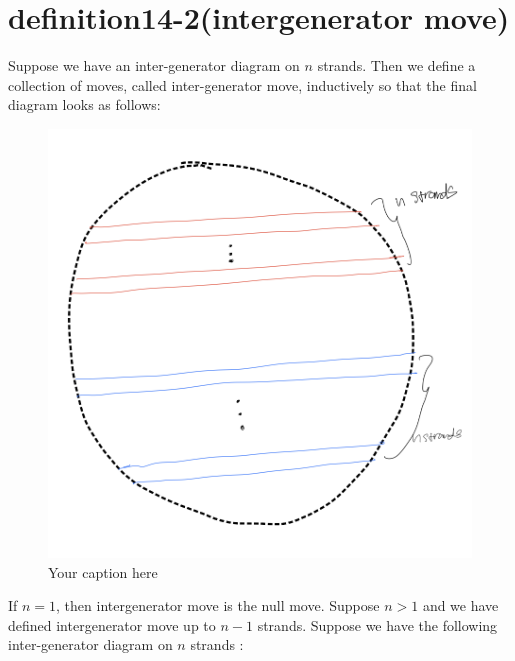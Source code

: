 \section{definition14-2(intergenerator move)}
\begin{definition}
\end{definition}

Suppose we have an inter-generator diagram on $n$ strands. Then we define a collection of moves, called inter-generator move, inductively so that the final diagram looks as follows:

\begin{figure}[H] %
    \centering
    \includegraphics[width=\linewidth]{diagrams/definition14-2/1.png} %
    \caption{Your caption here}
    \label{fig:your-label}
\end{figure}

If $n=1$, then intergenerator move is the null move. Suppose $n > 1$ and we have defined intergenerator move up to $n-1$ strands. Suppose we have the following inter-generator diagram on $n$ strands :

